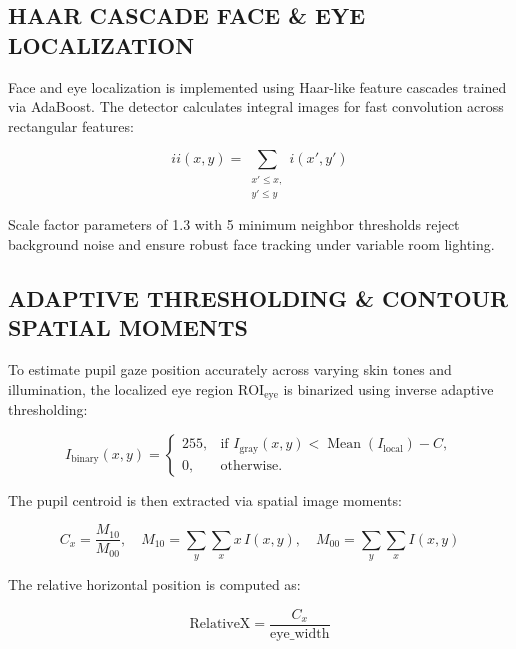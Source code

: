 \documentclass[12pt,a4paper]{report}
\begin{document}
\subsection{HAAR CASCADE FACE \& EYE LOCALIZATION}

Face and eye localization is implemented using Haar-like feature cascades trained via
AdaBoost. The detector calculates integral images for fast convolution across rectangular
features:

\begin{equation}
  ii(x, y) = \sum_{\substack{x' \le x,\\ y' \le y}} i(x', y')
  \label{eq:integral-image}
\end{equation}

Scale factor parameters of 1.3 with 5 minimum neighbor thresholds reject background
noise and ensure robust face tracking under variable room lighting.

\subsection{ADAPTIVE THRESHOLDING \& CONTOUR SPATIAL MOMENTS}

To estimate pupil gaze position accurately across varying skin tones and illumination, the
localized eye region $\text{ROI}_{\text{eye}}$ is binarized using inverse adaptive
thresholding:

\begin{equation}
  I_{\text{binary}}(x,y) =
  \begin{cases}
    255, & \text{if } I_{\text{gray}}(x,y) < \operatorname{Mean}(I_{\text{local}}) - C, \\
    0,   & \text{otherwise.}
  \end{cases}
  \label{eq:adaptive-threshold}
\end{equation}

The pupil centroid is then extracted via spatial image moments:

\begin{equation}
  C_x = \frac{M_{10}}{M_{00}}, \quad
  M_{10} = \sum_{y}\sum_{x} x\,I(x,y), \quad
  M_{00} = \sum_{y}\sum_{x} I(x,y)
  \label{eq:centroid}
\end{equation}

The relative horizontal position is computed as:

\begin{equation}
  \text{RelativeX} = \frac{C_x}{\text{eye\_width}}
  \label{eq:relativex}
\end{equation}
\end{document}

